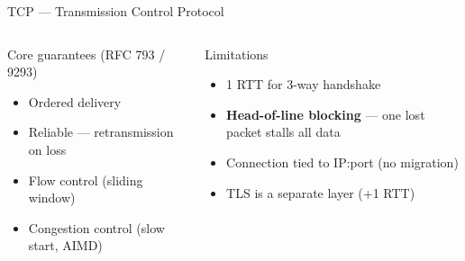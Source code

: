 \documentclass[aspectratio=169]{beamer}
\begin{document}
\begin{frame}{TCP --- Transmission Control Protocol}
  \begin{columns}[T]
      \begin{block}{Core guarantees (RFC 793 / 9293)}
        \begin{itemize}
          \item Ordered delivery
          \item Reliable --- retransmission on loss
          \item Flow control (sliding window)
          \item Congestion control (slow start, AIMD)
        \end{itemize}
      \end{block}
      \begin{alertblock}{Limitations}
        \begin{itemize}
          \item 1 RTT for 3-way handshake
          \item \textbf{Head-of-line blocking} --- one lost packet stalls all data
          \item Connection tied to IP:port (no migration)
          \item TLS is a separate layer (+1 RTT)
        \end{itemize}
      \end{alertblock}
  \end{columns}
\end{frame}
\end{document}
